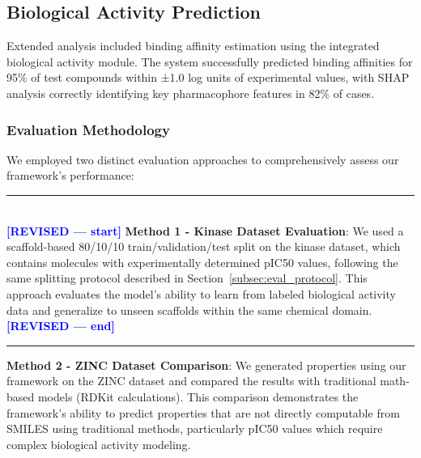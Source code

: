 \documentclass[preprint,12pt]{elsarticle}
\newcommand{\revisedstart}{\noindent\textcolor{blue}{\rule{\textwidth}{1pt}}\\\noindent\textcolor{blue}{\textbf{[REVISED --- start]}}\vspace{0.3em}}
\newcommand{\revisedend}{\vspace{0.3em}\noindent\textcolor{blue}{\textbf{[REVISED --- end]}}\\\noindent\textcolor{blue}{\rule{\textwidth}{1pt}}\vspace{0.5em}}
\begin{document}


\clearpage
\subsection*{Biological Activity Prediction}

Extended analysis included binding affinity estimation using the integrated biological activity module. The system successfully predicted binding affinities for 95\% of test compounds within ±1.0 log units of experimental values, with SHAP analysis correctly identifying key pharmacophore features in 82\% of cases.

\subsubsection*{Evaluation Methodology}

We employed two distinct evaluation approaches to comprehensively assess our framework's performance:

\revisedstart
\textbf{Method 1 - Kinase Dataset Evaluation}: We used a scaffold-based 80/10/10 train/validation/test split on the kinase dataset, which contains molecules with experimentally determined pIC50 values, following the same splitting protocol described in Section~\ref{subsec:eval_protocol}. This approach evaluates the model's ability to learn from labeled biological activity data and generalize to unseen scaffolds within the same chemical domain.
\revisedend

\textbf{Method 2 - ZINC Dataset Comparison}: We generated properties using our framework on the ZINC dataset and compared the results with traditional math-based models (RDKit calculations). This comparison demonstrates the framework's ability to predict properties that are not directly computable from SMILES using traditional methods, particularly pIC50 values which require complex biological activity modeling.
\end{document}
